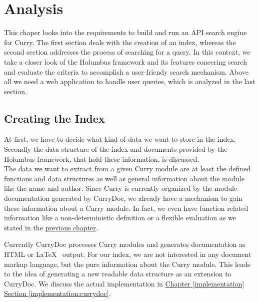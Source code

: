 \documentclass[%
	pdftex,%
	a4paper,%
	oneside,%
	chapterprefix,%
	headsepline,%
	12pt%
]{scrbook}
\begin{document}
\chapter{Analysis}\label{analysis}
This chaper looks into the requirements to build and run an API search
engine for Curry. The first section deals with the creation of an
index, whereas the second section addresses the process of searching
for a query. In this context, we take a closer look of the Holumbus
framework and its features concering search and evaluate the criteria
to accomplish a user-friendy search mechanism. Above all we need a web
application to handle user queries, which is analyzed in the last
section.




\section{Creating the Index}
At first, we have to decide what kind of data we want to store in
the index. Secondly the data structure of the index and documents
provided by the Holumbus framework, that hold
these information, is discussed.\\

The data we want to extract from a given Curry module are at least the
defined functions and data structures as well as general information
about the module like the name and author. Since Curry is currently
organized by the module documentation generated by CurryDoc, we
already have a mechanism to gain these information about a Curry
module. In fact, we even have function related information like a
non-deterministic definition or a flexible evaluation as we
stated in the \hyperref[preliminaries:curryInfo]{previous chapter}.

Currently CurryDoc processes Curry modules and generates documentation
as HTML or \LaTeX~ output. For our index, we are not interested in any
document markup language, but the pure information about the Curry
module. This leads to the idea of generating a new readable data
structure as an extension to CurryDoc. We discuss the actual
implementation in \hyperref[implementation:currydoc]{Chapter
  \ref{implementation} Section \ref{implementation:currydoc}}.\\
\end{document}
